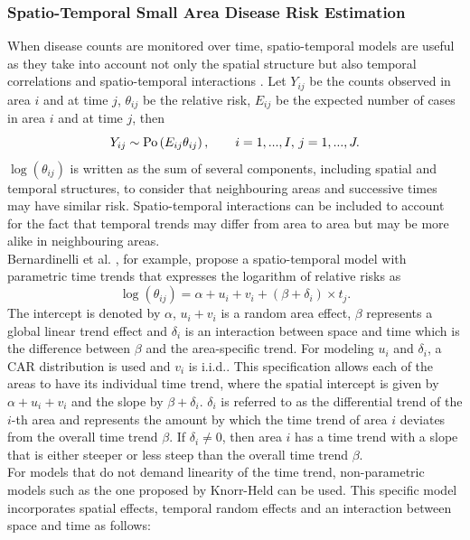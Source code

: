 \subsubsection{Spatio-Temporal Small Area Disease Risk Estimation}
When disease counts are monitored over time, spatio-temporal models are useful as they take into account not only the spatial structure but also temporal correlations and spatio-temporal interactions \autocite[][]{martinez2008autoregressive}. Let $Y_{ij}$ be the counts observed in area $i$ and at time $j$, $\theta_{ij}$ be the relative risk, $E_{ij}$ be the expected number of cases in area $i$ and at time $j$, then
\begin{equation}
    Y_{ij}\sim\hbox{Po}\left(E_{ij}\theta_{ij}\right), \hspace{20pt} i=1,...,I,\,j=1,...,J.
\end{equation}
$\log\left(\theta_{ij}\right)$ is written as the sum of several components, including spatial and temporal structures, to consider that neighbouring areas and successive times may have similar risk. Spatio-temporal interactions can be included to account for the fact that temporal trends may differ from area to area but may be more alike in neighbouring areas. \\
Bernardinelli et al. \autocite[][]{bernardinelli1995bayesian}, for example, propose a spatio-temporal model with parametric time trends that expresses the logarithm of relative risks as
\begin{equation}
    \log\left(\theta_{ij}\right)=\alpha+u_i+v_i+ \left(\beta+\delta_i\right)\times t_j.
\end{equation}
The intercept is denoted by $\alpha$, $u_i+v_i$ is a random area effect, $\beta$ represents a global linear trend effect and $\delta_i$ is an interaction between space and time which is the difference between $\beta$ and the area-specific trend. For modeling $u_i$ and $\delta_i$, a CAR distribution is used and $v_i$ is i.i.d.. This specification allows each of the areas to have its individual time trend, where the spatial intercept is given by $\alpha+u_i+v_i$ and the slope by $\beta+\delta_i$. $\delta_i$ is referred to as the differential trend of the $i$-th area and represents the amount by which the time trend of area $i$ deviates from the overall time trend $\beta$. If $\delta_i\neq 0$, then area $i$ has a time trend with a slope that is either steeper or less steep than the overall time trend $\beta$. \\
For models that do not demand linearity of the time trend, non-parametric models such as the one proposed by Knorr-Held \autocite[][]{knorr2000bayesian} can be used. This specific model incorporates spatial effects, temporal random effects and an interaction between space and time as follows:
